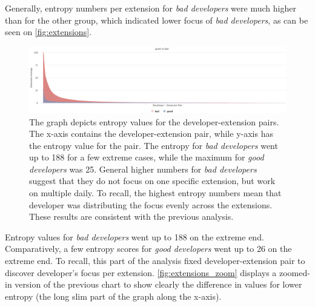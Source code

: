 Generally, entropy numbers per extension for \textit{bad developers} were much higher than for the other group, which indicated lower focus of \textit{bad developers}, as can be seen on  \autoref{fig:extensions}. 

\begin{figure}[htpb]
  \centering
  \includegraphics[width=1\textwidth]{figures/extensions}
  \caption[Focus Per Extension]{The graph depicts entropy values for the developer-extension pairs. The x-axis contains the developer-extension pair, while y-axis has the entropy value for the pair. The entropy for \textit{bad developers} went up to 188 for a few extreme cases, while the maximum for \textit{good developers} was 25. General higher numbers for \textit{bad developers} suggest that they do not focus on one specific extension, but work on multiple daily. To recall, the highest entropy numbers mean that developer was distributing the focus evenly across the extensions. These results are consistent with the previous analysis. } \label{fig:extensions}
\end{figure}

Entropy values for \textit{bad developers} went up to 188 on the extreme end. Comparatively, a few entropy scores for \textit{good developers} went up to 26 on the extreme end. To recall, this part of the analysis fixed developer-extension pair to discover developer’s focus per extension. \autoref{fig:extensions_zoom} displays a zoomed-in version of the previous chart to show clearly the difference in values for lower entropy (the long slim part of the graph along the x-axis).

